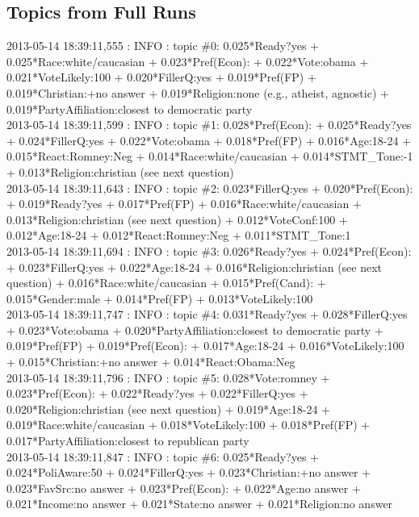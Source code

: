 \subsection{Topics from Full Runs}
2013-05-14 18:39:11,555 : INFO : topic \#0: 0.025*Ready?yes + 0.025*Race:white/caucasian + 0.023*Pref(Econ): + 0.022*Vote:obama + 0.021*VoteLikely:100 + 0.020*FillerQ:yes + 0.019*Pref(FP) + 0.019*Christian:+no answer + 0.019*Religion:none (e.g., atheist, agnostic) + 0.019*PartyAffiliation:closest to democratic party\\

2013-05-14 18:39:11,599 : INFO : topic \#1: 0.028*Pref(Econ): + 0.025*Ready?yes + 0.024*FillerQ:yes + 0.022*Vote:obama + 0.018*Pref(FP) + 0.016*Age:18-24 + 0.015*React:Romney:Neg + 0.014*Race:white/caucasian + 0.014*STMT_Tone:-1 + 0.013*Religion:christian (see next question)\\

2013-05-14 18:39:11,643 : INFO : topic \#2: 0.023*FillerQ:yes + 0.020*Pref(Econ): + 0.019*Ready?yes + 0.017*Pref(FP) + 0.016*Race:white/caucasian + 0.013*Religion:christian (see next question) + 0.012*VoteConf:100 + 0.012*Age:18-24 + 0.012*React:Romney:Neg + 0.011*STMT_Tone:1\\

2013-05-14 18:39:11,694 : INFO : topic \#3: 0.026*Ready?yes + 0.024*Pref(Econ): + 0.023*FillerQ:yes + 0.022*Age:18-24 + 0.016*Religion:christian (see next question) + 0.016*Race:white/caucasian + 0.015*Pref(Cand): + 0.015*Gender:male + 0.014*Pref(FP) + 0.013*VoteLikely:100\\

2013-05-14 18:39:11,747 : INFO : topic \#4: 0.031*Ready?yes + 0.028*FillerQ:yes + 0.023*Vote:obama + 0.020*PartyAffiliation:closest to democratic party + 0.019*Pref(FP) + 0.019*Pref(Econ): + 0.017*Age:18-24 + 0.016*VoteLikely:100 + 0.015*Christian:+no answer + 0.014*React:Obama:Neg\\

2013-05-14 18:39:11,796 : INFO : topic \#5: 0.028*Vote:romney + 0.023*Pref(Econ): + 0.022*Ready?yes + 0.022*FillerQ:yes + 0.020*Religion:christian (see next question) + 0.019*Age:18-24 + 0.019*Race:white/caucasian + 0.018*VoteLikely:100 + 0.018*Pref(FP) + 0.017*PartyAffiliation:closest to republican party\\

2013-05-14 18:39:11,847 : INFO : topic \#6: 0.025*Ready?yes + 0.024*PoliAware:50 + 0.024*FillerQ:yes + 0.023*Christian:+no answer + 0.023*FavSrc:no answer + 0.023*Pref(Econ): + 0.022*Age:no answer + 0.021*Income:no answer + 0.021*State:no answer + 0.021*Religion:no answer\\

